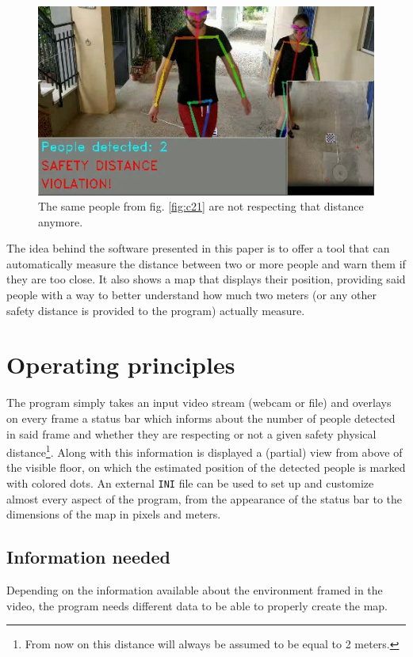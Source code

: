 \documentclass[12pt]{article}
\begin{document}
\begin{figure}[H]
\begin{center}
    \includegraphics[width=0.85\linewidth]{img/sample_c2_2.jpg}
\end{center}
   \caption{The same people from fig. \ref{fig:c21} are not respecting that distance anymore.}
\label{fig:c22}
\end{figure}

The idea behind the software presented in this paper is to offer a tool that can automatically measure the distance between two or more people and warn them if they are too close. It also shows a map that displays their position, providing said people with a way to better understand how much two meters (or any other safety distance is provided to the program) actually measure.

\section{Operating principles}
\label{chap:principles}
The program simply takes an input video stream (webcam or file) and overlays on every frame a status bar which informs about the number of people detected in said frame and whether they are respecting or not a given safety physical distance\footnote{From now on this distance will always be assumed to be equal to 2 meters.}. Along with this information is displayed a (partial) view from above of the visible floor, on which the estimated position of the detected people is marked with colored dots. An external \lstinline{INI} file can be used to set up and customize almost every aspect of the program, from the appearance of the status bar to the dimensions of the map in pixels and meters.

\subsection{Information needed}
\label{chap:info}
Depending on the information available about the environment framed in the video, the program needs different data to be able to properly create the map.
\end{document}
